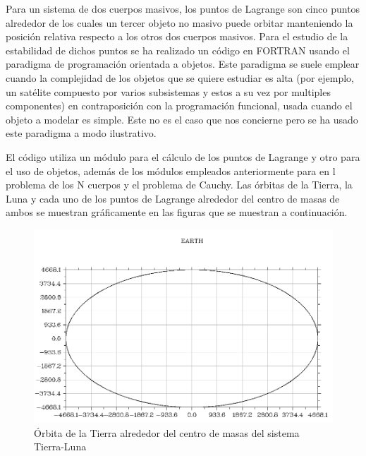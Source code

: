 \documentclass{article}
\begin{document}
	Para un sistema de dos cuerpos masivos, los puntos de Lagrange son cinco puntos alrededor de los cuales un tercer objeto no masivo puede orbitar manteniendo la posición relativa respecto a los otros dos cuerpos masivos. Para el estudio de la estabilidad de dichos puntos se ha realizado un código en FORTRAN usando el paradigma de programación orientada a objetos. Este paradigma se suele emplear cuando la complejidad de los objetos que se quiere estudiar es alta (por ejemplo, un satélite compuesto por varios subsistemas y estos a su vez por multiples componentes) en contraposición con la programación funcional, usada cuando el objeto a modelar es simple. Este no es el caso que nos concierne pero se ha usado este paradigma a modo ilustrativo.
	
	El código utiliza un módulo para el cálculo de los puntos de Lagrange y otro para el uso de objetos, además de los módulos empleados anteriormente para en l problema de los N cuerpos y el problema de Cauchy. Las órbitas de la Tierra, la Luna y cada uno de los puntos de Lagrange alrededor del centro de masas de ambos se muestran gráficamente en las figuras que se muestran a continuación.
	
	\begin{figure}[h!]
		\begin{center}
			\includegraphics[scale=0.4]{earth.png}
			\caption{Órbita de la Tierra alrededor del centro de masas del sistema Tierra-Luna}
		\end{center}
	\end{figure}
\end{document}
